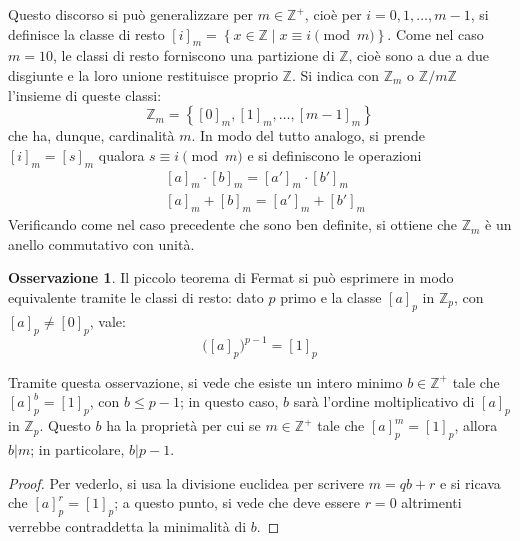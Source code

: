 \documentclass[11pt, a4paper]{scrartcl}
\theoremstyle{definition}
\numberwithin{esempio}{section}
\theoremstyle{definition}
\newtheorem{obs}{Osservazione}
\numberwithin{obs}{section}
\numberwithin{nota}{section}
\numberwithin{equation}{subsection}
\begin{document}
Questo discorso si pu\`o generalizzare per $m \in \mathbb{Z}^+$, cio\`e per $i = 0,1,\ldots,m-1$, si definisce la classe di resto $[i]_m = \left\{ x \in \mathbb{Z}  \mid x\equiv i \pmod{m}  \right\} $. 
Come nel caso $m=10$, le classi di resto forniscono una partizione di $\mathbb{Z}$, cio\`e sono a due a due disgiunte e la loro unione restituisce proprio $\mathbb{Z}$.
Si indica con $\mathbb{Z}_m$ o $\mathbb{Z} / m \mathbb{Z}$ l'insieme di queste classi:
\begin{equation}
	\mathbb{Z}_m = \left\{ [0]_m , [1]_m ,\ldots, [m-1]_{m}  \right\} 
\end{equation}
che ha, dunque, cardinalit\`a $m$.
In modo del tutto analogo, si prende $[i]_m = [s]_m$ qualora $s\equiv i \pmod{m} $ e si definiscono le operazioni
\[
	\begin{split}
		&[a]_{m} \cdot [b]_{m} = [a']_{m} \cdot [b']_{m} \\
		&[a]_{m} + [b]_{m} = [a']_{m} + [b']_{m} 
	\end{split}
\] 
Verificando come nel caso precedente che sono ben definite, si ottiene che $\mathbb{Z}_m$ \`e un anello commutativo con unit\`a.

\begin{obs}
	Il piccolo teorema di Fermat si pu\`o esprimere in modo equivalente tramite le classi di resto: dato $p$ primo e la classe $[a]_p$ in $\mathbb{Z}_p$, con $[a]_p \neq [0]_p$, vale:
	\begin{equation}
		\big([a]_p\big)^{p-1} = [1]_p
	\end{equation}
\end{obs}
Tramite questa osservazione, si vede che esiste un intero minimo $b \in \mathbb{Z}^+$ tale che $[a]^b_p = [1]_p$, con $b \le p-1$; in questo caso, $b$ sar\`a l'ordine moltiplicativo di $[a]_p$ in $\mathbb{Z}_p$.
Questo $b$ ha la propriet\`a per cui se $m \in \mathbb{Z}^+$ tale che $[a]_p^m = [1]_p$, allora $b | m$; in particolare, $b | p-1$.
\begin{proof}
	Per vederlo, si usa la divisione euclidea per scrivere $m=qb +r$ e si ricava che $[a]_p^r = [1]_p$; a questo punto, si vede che deve essere $r=0$ altrimenti verrebbe contraddetta la minimalit\`a di $b$.
\end{proof}
\end{document}
